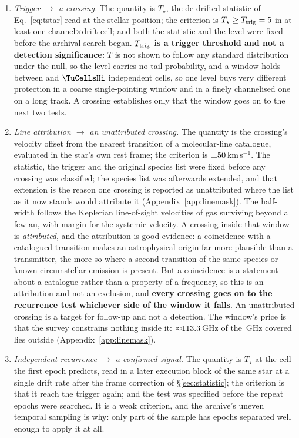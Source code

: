 \begin{enumerate}[label=(\roman*),leftmargin=1.9em,itemsep=3pt,topsep=3pt,parsep=0pt]
\item \emph{Trigger $\to$ a crossing.} The quantity is $T_\star$, the
de-drifted statistic of Eq.~\ref{eq:tstar} read at the stellar position; the
criterion is $T_\star\geq T_{\rm trig}=5$ in at least one
channel$\times$drift cell; and both the statistic and the level were fixed
before the archival search began. \textbf{$T_{\rm trig}$ is a trigger
threshold and not a detection significance:} $T$ is not shown to follow any
standard distribution under the null, so the level carries no tail
probability, and a window holds between \TuCellsLo{} and $\TuCellsHi$
independent cells, so one level buys very different protection in a coarse
single-pointing window and in a finely channelised one on a long track. A
crossing establishes only that the window goes on to the next two tests.
\item \emph{Line attribution $\to$ an unattributed crossing.} The quantity
is the crossing's velocity offset from the nearest transition of a
molecular-line catalogue, evaluated in the star's own rest frame; the
criterion is $\pm50$\,km\,s$^{-1}$. The statistic, the trigger and
the original species list were fixed before any crossing was classified; the
species list was afterwards extended, and that extension is the reason one
crossing is reported as unattributed where the list as it now stands would
attribute it (Appendix~\ref{app:linemask}). The half-width follows the Keplerian line-of-sight velocities of gas
surviving beyond a few au, with margin for the systemic velocity. A crossing
inside that window is \emph{attributed}, and the attribution is good
evidence: a coincidence with a catalogued transition makes an astrophysical
origin far more plausible than a transmitter, the more so where a second
transition of the same species or known circumstellar emission is present.
But a coincidence is a statement about a catalogue rather than a property of
a frequency, so this is an attribution and not an exclusion, and
\textbf{every crossing goes on to the recurrence test whichever side of the
window it falls}. An unattributed crossing is a target for follow-up and not
a detection. The window's price is that the survey constrains nothing inside
it: ${\approx}113.3$\,GHz of the \UnionGHz\,GHz covered lies
outside (Appendix~\ref{app:linemask}).
\item \emph{Independent recurrence $\to$ a confirmed signal.} The quantity is
$T_\star$ at the cell the first epoch predicts, read in a later execution
block of the same star at a single drift rate after the frame correction of
\S\ref{sec:statistic}; the criterion is that it reach the trigger again; and
the test was specified before the repeat epochs were searched. It is a weak
criterion, and the archive's uneven temporal sampling is why: only part of
the sample has epochs separated well enough to apply it at all.
\end{enumerate}

